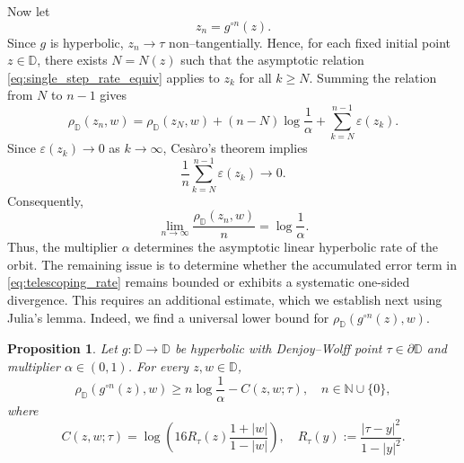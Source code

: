 \documentclass[12pt]{amsart}
\numberwithin{equation}{section}
\theoremstyle{plain}
\newtheorem{proposition}[equation]{Proposition}
\theoremstyle{definition}
\begin{document}
Now let
\begin{equation*}
z_n=g^{\circ n}(z).
\end{equation*}
Since $g$ is hyperbolic, $z_n\to\tau$ non--tangentially. Hence, for
each fixed initial point $z\in\mathbb{D}$, there exists $N=N(z)$ such
that the asymptotic relation \eqref{eq:single_step_rate_equiv} applies
to $z_k$ for all $k\geq N$. Summing the relation from $N$ to $n-1$ gives
\begin{equation}
\label{eq:telescoping_rate}
\rho_{\mathbb{D}}(z_n,w)
=
\rho_{\mathbb{D}}(z_N,w)
+
(n-N)\log\frac{1}{\alpha}
+
\sum_{k=N}^{n-1}\varepsilon(z_k).
\end{equation}
Since $\varepsilon(z_k)\to0$ as $k\to\infty$, Ces\`aro's theorem implies
\begin{equation*}
\frac{1}{n}
\sum_{k=N}^{n-1}\varepsilon(z_k)
\longrightarrow 0.
\end{equation*}
Consequently,
\begin{equation}
\label{eq:asymptotic_hyperbolic_rate}
\lim_{n\to\infty}
\frac{\rho_{\mathbb{D}}(z_n,w)}{n}
=
\log\frac{1}{\alpha}.
\end{equation}
Thus, the multiplier $\alpha$ determines the asymptotic linear
hyperbolic rate of the orbit. The remaining issue is to determine
whether the accumulated error term in \eqref{eq:telescoping_rate}
remains bounded or exhibits a systematic one-sided divergence. This
requires an additional estimate, which we establish next using
Julia's lemma. Indeed, we find a universal lower bound for $\rho_{\mathbb{D}}(g^{\circ n}(z),w)$.



\begin{proposition}\label{prop:julia-lower-bound}
Let $g:\mathbb{D}\to\mathbb{D}$ be hyperbolic with Denjoy--Wolff point
$\tau\in\partial\mathbb{D}$ and multiplier $\alpha\in(0,1)$. For every
$z,w\in\mathbb{D}$,
\begin{equation}
\label{eq:julia-lower-bound}
\rho_{\mathbb{D}}(g^{\circ n}(z),w)
\ge
n\log\frac{1}{\alpha}
-
C(z,w;\tau),
\quad n\in\mathbb{N}\cup\{0\},
\end{equation}
where
\begin{equation*}
C(z,w;\tau)
=
\log\left(
16R_\tau(z)\frac{1+|w|}{1-|w|}
\right),
\quad
R_\tau(y):=
\frac{|\tau-y|^2}{1-|y|^2}.
\end{equation*}
\end{proposition}
\end{document}
